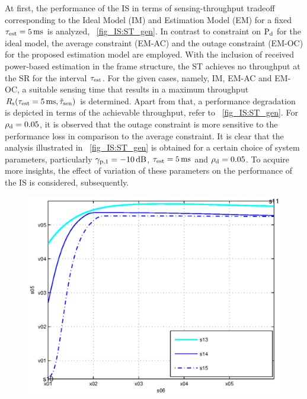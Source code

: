 {At first, the performance of the IS in terms of sensing-throughput tradeoff corresponding to the Ideal Model (IM) and Estimation Model (EM) for a fixed $\tau_{\text{est}} = \SI{5}{ms}$ is analyzed,  \figurename~\ref{fig_IS:ST_gen}. In contrast to constraint on $\text{P}_{\text{d}}$ for the ideal model, the average constraint (EM-AC) and the outage constraint (EM-OC) for the proposed estimation model are employed. With the inclusion of received power-based estimation in the frame structure, the ST achieves no throughput at the SR for the interval $\tau_{\text{est}}$. For the given cases, namely, IM, EM-AC and EM-OC, a suitable sensing time that results in a maximum throughput $R_{\text{s}}(\tau_{\text{est}} = \SI{5}{ms},\tilde{\tau}_{\text{sen}})$ is determined. Apart from that, a performance degradation is depicted in terms of the achievable throughput, refer to \figurename~\ref{fig_IS:ST_gen}. For $\rho_{\text{d}} = 0.05$, it is observed that the outage constraint is more sensitive to the performance loss in comparison to the average constraint. It is clear that the analysis illustrated in \figurename~\ref{fig_IS:ST_gen} is obtained for a certain choice of system parameters, particularly ${\gamma}_{\text{p,1}} = -\SI{10}{dB}$, $\tau_{\text{est}} = \SI{5}{ms}$ and $\rho_{\text{d}} = 0.05$. To acquire more insights, the effect of variation of these parameters on the performance of the IS is considered, subsequently. 

\begin{figure}[!ht]


\centering
\includegraphics[width= \figscale]{figures/fig_opt_thr_vs_SNR_AWGN}
\caption{}
\label{fig_IS:optT_snr}
\end{figure}

}
